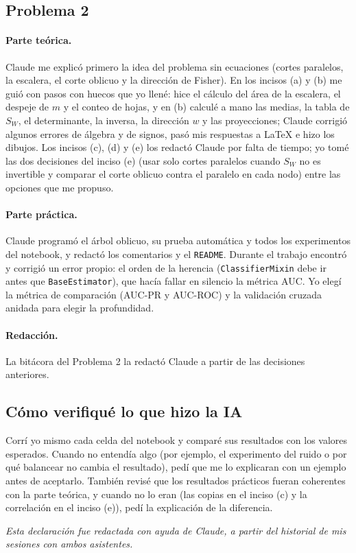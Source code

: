\documentclass[11pt, letterpaper]{article}
\begin{document}
\subsection*{Problema 2}

\paragraph{Parte teórica.} Claude me explicó primero la idea del problema sin ecuaciones (cortes paralelos, la escalera, el corte oblicuo y la dirección de Fisher). En los incisos (a) y (b) me guió con pasos con huecos que yo llené: hice el cálculo del área de la escalera, el despeje de $m$ y el conteo de hojas, y en (b) calculé a mano las medias, la tabla de $S_W$, el determinante, la inversa, la dirección $w$ y las proyecciones; Claude corrigió algunos errores de álgebra y de signos, pasó mis respuestas a \LaTeX{} e hizo los dibujos. Los incisos (c), (d) y (e) los redactó Claude por falta de tiempo; yo tomé las dos decisiones del inciso (e) (usar solo cortes paralelos cuando $S_W$ no es invertible y comparar el corte oblicuo contra el paralelo en cada nodo) entre las opciones que me propuso.

\paragraph{Parte práctica.} Claude programó el árbol oblicuo, su prueba automática y todos los experimentos del notebook, y redactó los comentarios y el \texttt{README}. Durante el trabajo encontró y corrigió un error propio: el orden de la herencia (\texttt{ClassifierMixin} debe ir antes que \texttt{BaseEstimator}), que hacía fallar en silencio la métrica AUC. Yo elegí la métrica de comparación (AUC-PR y AUC-ROC) y la validación cruzada anidada para elegir la profundidad.

\paragraph{Redacción.} La bitácora del Problema 2 la redactó Claude a partir de las decisiones anteriores.

\subsection*{Cómo verifiqué lo que hizo la IA}
Corrí yo mismo cada celda del notebook y comparé sus resultados con los valores esperados. Cuando no entendía algo (por ejemplo, el experimento del ruido o por qué balancear no cambia el resultado), pedí que me lo explicaran con un ejemplo antes de aceptarlo. También revisé que los resultados prácticos fueran coherentes con la parte teórica, y cuando no lo eran (las copias en el inciso (c) y la correlación en el inciso (e)), pedí la explicación de la diferencia.

\medskip
\noindent\textit{Esta declaración fue redactada con ayuda de Claude, a partir del historial de mis sesiones con ambos asistentes.}
\end{document}
